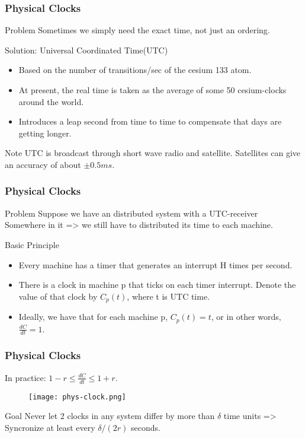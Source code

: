 \begin{frame}
    \frametitle{Physical Clocks}
    \begin{block}{Problem}
        Sometimes we simply need the exact time, not just an ordering.
    \end{block}
    \begin{block}{Solution: Universal Coordinated Time(UTC)}
    \begin{itemize}
        \item Based on the number of transitions/sec of the cesium 133 atom.
        \item At present, the real time is taken as the average of some 50 cesium-clocks around the world.
        \item Introduces a leap second from time to time to compensate that days are getting longer.
    \end{itemize}
    \end{block}
    \begin{block}{Note}
        UTC is broadcast through short wave radio and satellite. Satellites can give an accuracy of about $\pm 0.5 ms$.
    \end{block}
\end{frame}

\begin{frame}
    \frametitle{Physical Clocks}
    \begin{block}{Problem}
        Suppose we have an distributed system with a UTC-receiver \\
        Somewhere in it => we still have to distributed its time to each machine.
    \end{block}
    \begin{block}{Basic Principle}
        \begin{itemize}
            \item Every machine has a timer that generates an interrupt H times per second.
            \item There is a clock in machine p that ticks on each timer interrupt. Denote the value of that clock by $C_p(t)$, where t is UTC time.
            \item Ideally, we have that for each machine p, $C_p(t) = t$, or in other words, $\frac{dC}{dt} = 1$.
        \end{itemize}
    \end{block}
\end{frame}

\begin{frame}
    \frametitle{Physical Clocks}
    \alert{In practice}: $1 - r \le \frac{dC}{dt} \le 1 + r$.
    \begin{figure}
        \centering
        \texttt{[image: phys-clock.png]}
    \end{figure}
    \begin{block}{Goal}
        Never let 2 clocks in any system differ by more than $\delta$ time units => \\
        Syncronize at least every $\delta/(2r)$ seconds.
    \end{block}
\end{frame}

